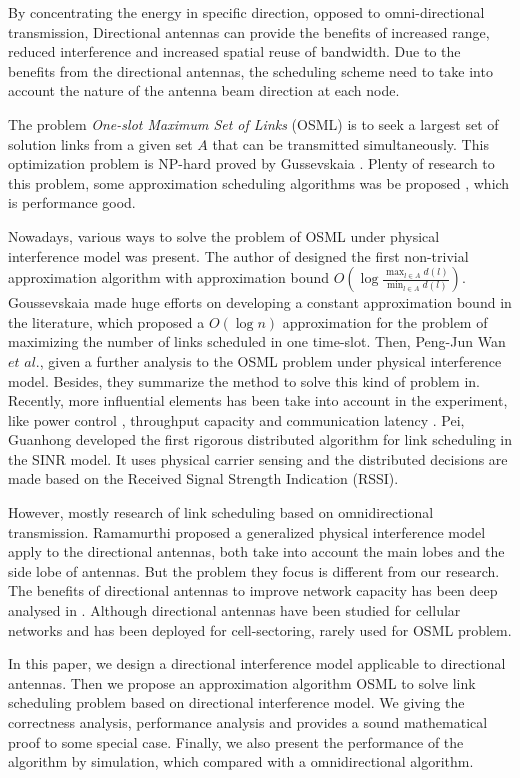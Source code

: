 \documentclass[conference]{IEEEtran}
\begin{document}
By concentrating the energy in specific direction, opposed to omni-directional transmission, Directional antennas can provide the benefits of increased range, reduced interference and increased spatial reuse of bandwidth. Due to the benefits from the directional antennas, the scheduling scheme need to take into account the nature of the antenna beam direction at each node.


The problem \emph{One-slot Maximum Set of Links} (OSML) is to seek a largest set of solution links from a given set $A$ that can be transmitted simultaneously. This optimization problem is NP-hard proved by Gussevskaia \cite{1}. Plenty of research to this problem, some approximation scheduling algorithms was be proposed \cite{1,2}, which is performance good.


Nowadays, various ways to solve the problem of OSML under physical interference model was present. The author of \cite{1} designed the first non-trivial approximation algorithm with approximation bound $O(\log {\frac{\max_{l \in A }d(l)}{\min_{l \in A} d(l)}}) $. Goussevskaia made huge efforts on developing a constant approximation bound in the literature\cite{2}, which proposed a $O(\log {n})$ approximation for the problem of maximizing the number of links scheduled in one time-slot. Then, Peng-Jun Wan $et$ $al$., \cite{3} given a further analysis to the OSML problem under physical interference model. Besides, they summarize the method to solve this kind of problem in\cite{7}. Recently, more influential elements has been take into account in the experiment, like power control \cite{9}, throughput capacity and communication latency \cite{14}. Pei, Guanhong\cite{5} developed the first rigorous distributed algorithm for link scheduling in the SINR model. It uses physical carrier sensing and the distributed decisions are made based on the Received Signal Strength Indication (RSSI).


However, mostly research of link scheduling based on omnidirectional transmission. Ramamurthi\cite{4} proposed a generalized physical interference model apply to the directional antennas, both take into account the main lobes and the side lobe of antennas. But the problem they focus is different from our research. The benefits of directional antennas to improve network capacity has been deep analysed in \cite{10}. Although directional antennas have been studied for cellular networks and has been deployed for cell-sectoring, rarely used for OSML problem.

In this paper, we design a directional interference model applicable to directional antennas. Then we propose an approximation algorithm OSML to solve link scheduling problem based on directional interference model. We giving the correctness analysis, performance analysis and provides a sound mathematical proof to some special case. Finally, we also present the performance of the algorithm by simulation, which compared with a omnidirectional algorithm.
\end{document}
